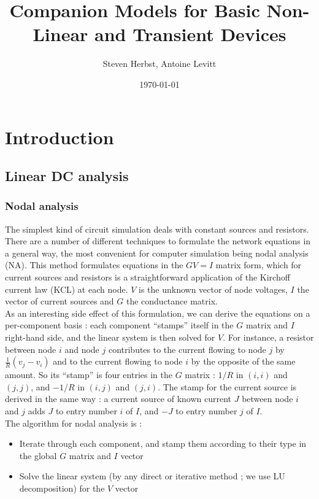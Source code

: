 \documentclass{article}
\begin{document}
\title{Companion Models for Basic Non-Linear and Transient Devices}
\author{Steven Herbst, Antoine Levitt}
\date{\today}

\maketitle

\section{Introduction}
\subsection{Linear DC analysis}
\subsubsection{Nodal analysis}
The simplest kind of circuit simulation deals with constant sources and resistors. There are a number of different techniques to formulate the network equations in a general way, the most convenient for computer simulation being nodal analysis (NA). This method formulates equations in the $GV = I$ matrix form, which for current sources and resistors is a straightforward application of the Kirchoff current law (KCL) at each node. $V$ is the unknown vector of node voltages, $I$ the vector of current sources and $G$ the conductance matrix.\\
As an interesting side effect of this formulation, we can derive the equations on a per-component basis : each component ``stamps'' itself in the $G$ matrix and $I$ right-hand side, and the linear system is then solved for $V$. For instance, a resistor between node $i$ and node $j$ contributes to the current flowing to node $j$ by $\frac{1}{R} (v_j - v_i)$ and to the current flowing to node $i$ by the opposite of the same amount. So its ``stamp'' is four entries in the $G$ matrix : $1/R$ in $(i,i)$ and $(j,j)$, and $-1/R$ in $(i,j)$ and $(j,i)$. The stamp for the current source is derived in the same way : a current source of known current $J$ between node $i$ and $j$ adds $J$ to entry number $i$ of $I$, and $-J$ to entry number $j$ of $I$.\\
The algorithm for nodal analysis is :
\begin{itemize}
\item Iterate through each component, and stamp them according to their type in the global $G$ matrix and $I$ vector
\item Solve the linear system (by any direct or iterative method ; we use LU decomposition) for the $V$ vector
\end{itemize}
\end{document}
